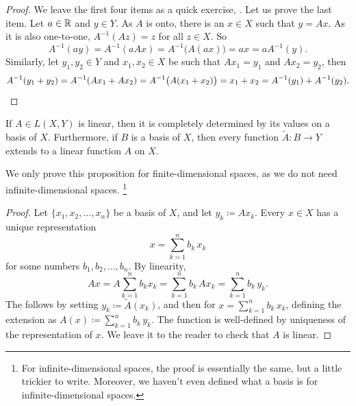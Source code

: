 \begin{proof}
We leave the first four items as a quick exercise,
.
Let us prove the last item.
Let $a \in {\mathbb{R}}$ and $y \in Y$.  As $A$ is onto, there is an 
$x \in X$ such that $y = Ax$.
As it is also one-to-one, $A^{-1}(Az) = z$ for all $z \in X$.
So
\begin{equation*}
A^{-1}(ay)
=
A^{-1}(aAx)
=
A^{-1}\bigl(A(ax)\bigr)
= ax
= aA^{-1}(y).
\end{equation*}
Similarly, let $y_1,y_2 \in Y$ and $x_1, x_2 \in X$ be such that
$Ax_1 = y_1$ and 
$Ax_2 = y_2$, then
\begin{equation*}
A^{-1}(y_1+y_2)
=
A^{-1}(Ax_1+Ax_2)
=
A^{-1}\bigl(A(x_1+x_2)\bigr)
= x_1+x_2
= A^{-1}(y_1) + A^{-1}(y_2). \qedhere
\end{equation*}
\end{proof}

\begin{prop} \label{mv:lindefonbasis}
If $A \in L(X,Y)$ is linear, then it is completely determined
by its values on a basis of $X$.
Furthermore, if $B$ is a basis of $X$,
then every function $\widetilde{A} \colon B \to Y$ extends to a linear
function $A$ on $X$.
\end{prop}

We only prove this proposition for finite-dimensional spaces, as we do
not need infinite-dimensional spaces.%
\footnote{For infinite-dimensional spaces, the proof is essentially the same, but a
little trickier to write.
Moreover, we haven't even defined what a basis is for
infinite-dimensional spaces.}

\begin{proof}
Let $\{ x_1, x_2, \ldots, x_n \}$ be a basis of $X$, and let 
$y_k \coloneqq A x_k$.  Every $x \in X$ has a unique representation
\begin{equation*}
x = \sum_{k=1}^n b_k \, x_k
\end{equation*}
for some numbers $b_1,b_2,\ldots,b_n$.  By linearity,
\begin{equation*}
Ax = 
A\sum_{k=1}^n b_k x_k
=
\sum_{k=1}^n b_k \, Ax_k
=
\sum_{k=1}^n b_k \, y_k .
\end{equation*}
The  follows by setting $y_k \coloneqq \widetilde{A}(x_k)$,
and then for 
$x = \sum_{k=1}^n b_k \, x_k$,
defining the extension as
$A(x) \coloneqq \sum_{k=1}^n b_k \, y_k$.  The function is well-defined by
uniqueness of the representation of $x$.
We leave it to the reader to check that $A$ is linear.
\end{proof}

